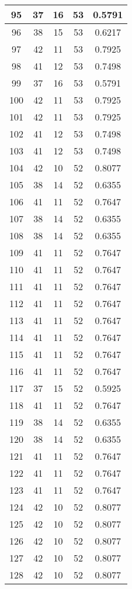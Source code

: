 \documentclass[letterpaper, 12pt]{article}
\begin{document}
\begin{longtable}{|c|c|c|c|c|}
95 & 37 & 16 & 53 & 0.5791 \\
\hline
96 & 38 & 15 & 53 & 0.6217 \\
\hline
97 & 42 & 11 & 53 & 0.7925 \\
\hline
98 & 41 & 12 & 53 & 0.7498 \\
\hline
99 & 37 & 16 & 53 & 0.5791 \\
\hline
100 & 42 & 11 & 53 & 0.7925 \\
\hline
101 & 42 & 11 & 53 & 0.7925 \\
\hline
102 & 41 & 12 & 53 & 0.7498 \\
\hline
103 & 41 & 12 & 53 & 0.7498 \\
\hline
104 & 42 & 10 & 52 & 0.8077 \\
\hline
105 & 38 & 14 & 52 & 0.6355 \\
\hline
106 & 41 & 11 & 52 & 0.7647 \\
\hline
107 & 38 & 14 & 52 & 0.6355 \\
\hline
108 & 38 & 14 & 52 & 0.6355 \\
\hline
109 & 41 & 11 & 52 & 0.7647 \\
\hline
110 & 41 & 11 & 52 & 0.7647 \\
\hline
111 & 41 & 11 & 52 & 0.7647 \\
\hline
112 & 41 & 11 & 52 & 0.7647 \\
\hline
113 & 41 & 11 & 52 & 0.7647 \\
\hline
114 & 41 & 11 & 52 & 0.7647 \\
\hline
115 & 41 & 11 & 52 & 0.7647 \\
\hline
116 & 41 & 11 & 52 & 0.7647 \\
\hline
117 & 37 & 15 & 52 & 0.5925 \\
\hline
118 & 41 & 11 & 52 & 0.7647 \\
\hline
119 & 38 & 14 & 52 & 0.6355 \\
\hline
120 & 38 & 14 & 52 & 0.6355 \\
\hline
121 & 41 & 11 & 52 & 0.7647 \\
\hline
122 & 41 & 11 & 52 & 0.7647 \\
\hline
123 & 41 & 11 & 52 & 0.7647 \\
\hline
124 & 42 & 10 & 52 & 0.8077 \\
\hline
125 & 42 & 10 & 52 & 0.8077 \\
\hline
126 & 42 & 10 & 52 & 0.8077 \\
\hline
127 & 42 & 10 & 52 & 0.8077 \\
\hline
128 & 42 & 10 & 52 & 0.8077 \\

\end{longtable}
\end{document}
